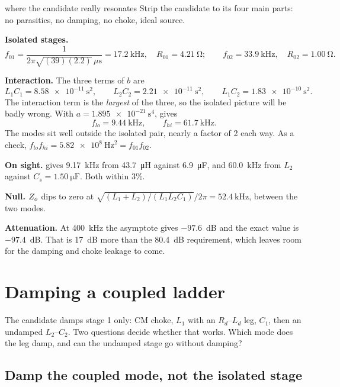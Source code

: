 \begin{examplebox}[label=ex:coupled]{where the candidate really resonates}
	Strip the candidate to its four main parts: no parasitics, no damping, no
	choke, ideal source.

	\textbf{Isolated stages.}
	\[
		f_{01} = \frac{1}{2\pi\sqrt{(39)(2.2)}\,\mu\text{s}} = \qty{17.2}{\kHz}, \quad R_{01} = \qty{4.21}{\ohm};
		\qquad
		f_{02} = \qty{33.9}{\kHz}, \quad R_{02} = \qty{1.00}{\ohm}.
	\]

	\textbf{Interaction.} The three terms of $b$ are
	\[
		L_1C_1 = \qty{8.58e-11}{\second\squared}, \qquad
		L_2C_2 = \qty{2.21e-11}{\second\squared}, \qquad
		L_1C_2 = \qty{1.83e-10}{\second\squared}.
	\]
	The interaction term is the \emph{largest} of the three, so the isolated
	picture will be badly wrong. With $a = \qty{1.895e-21}{\second\tothe{4}}$,
	 gives
	\[
		f_{lo} = \qty{9.44}{\kHz}, \qquad f_{hi} = \qty{61.7}{\kHz}.
	\]
	The modes sit well outside the isolated pair, nearly a factor of 2 each way.
	As a check, $f_{lo}f_{hi} = \qty{5.82e8}{\hertz\squared} = f_{01}f_{02}$.

	\textbf{On sight.}  gives \qty{9.17}{\kHz} from
	\qty{43.7}{\micro\henry} against \qty{6.9}{\micro\farad}, and \qty{60.0}{\kHz}
	from $L_2$ against $C_s = \qty{1.50}{\micro\farad}$. Both within 3\%.

	\textbf{Null.} $Z_o$ dips to zero at
	$\sqrt{(L_1+L_2)/(L_1L_2C_1)}/2\pi = \qty{52.4}{\kHz}$, between the two modes.

	\textbf{Attenuation.} At \qty{400}{\kHz} the asymptote gives $-97.6$~dB and
	the exact value is $-97.4$~dB. That is 17~dB more than the 80.4~dB
	requirement, which leaves room for the damping and choke leakage to come.
\end{examplebox}


\section{Damping a coupled ladder}
\label{sec:damp-ladder}

The candidate damps stage 1 only: CM choke, $L_1$ with an $R_d$--$L_d$
leg, $C_1$, then an undamped $L_2$--$C_2$. Two questions decide whether that
works. Which mode does the leg damp, and can the undamped stage go without damping?

\subsection{Damp the coupled mode, not the isolated stage}

